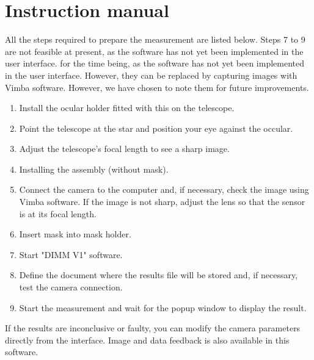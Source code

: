 \section{Instruction manual}
All the steps required to prepare the measurement are listed below. Steps 7 to 9 are not feasible at present, 
as the software has not yet been implemented in the user interface.
for the time being, as the software has not yet been implemented in the user interface. However, they can be replaced by capturing images with Vimba software. However, we have chosen to note them for future improvements.
\begin{enumerate}
    \item Install the ocular holder fitted with this on the telescope.
    \item Point the telescope at the star and position your eye against the occular.
    \item Adjust the telescope's focal length to see a sharp image.
    \item Installing the assembly (without mask).
    \item Connect the camera to the computer and, if necessary, check the image using Vimba software. 
    If the image is not sharp, adjust the lens so that the sensor is at its focal length.
    \item Insert mask into mask holder.
    \item Start "DIMM V1" software.
    \item Define the document where the results file will be stored and, if necessary, test the camera connection.
    \item Start the measurement and wait for the popup window to display the result.
\end{enumerate}
If the results are inconclusive or faulty, you can modify the camera parameters directly from the interface.
Image and data feedback is also available in this software.